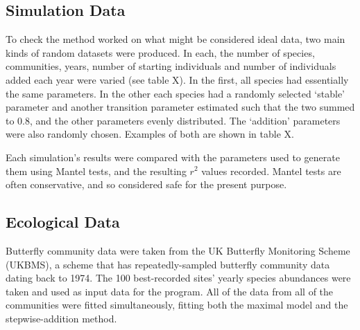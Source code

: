 \documentclass[11pt]{amsart}
\begin{document}
\subsection{Simulation Data}
To check the method worked on what might be considered ideal data, two main kinds of random datasets were produced. In each, the number of species, communities, years, number of starting individuals and number of individuals added each year were varied (see table X). In the first, all species had essentially the same parameters. In the other each species had a randomly selected `stable' parameter and another transition parameter estimated such that the two summed to 0.8, and the other parameters evenly distributed. The `addition' parameters were also randomly chosen. Examples of both are shown in table X.

Each simulation's results were compared with the parameters used to generate them using Mantel tests, and the resulting $r^{2}$ values recorded. Mantel tests are often conservative, and so considered safe for the present purpose.
\subsection{Ecological Data}
Butterfly community data were taken from the UK Butterfly Monitoring Scheme (UKBMS), a scheme that has repeatedly-sampled butterfly community data dating back to 1974. The 100 best-recorded sites' yearly species abundances were taken and used as input data for the program. All of the data from all of the communities were fitted simultaneously, fitting both the maximal model and the stepwise-addition method.
\end{document}
